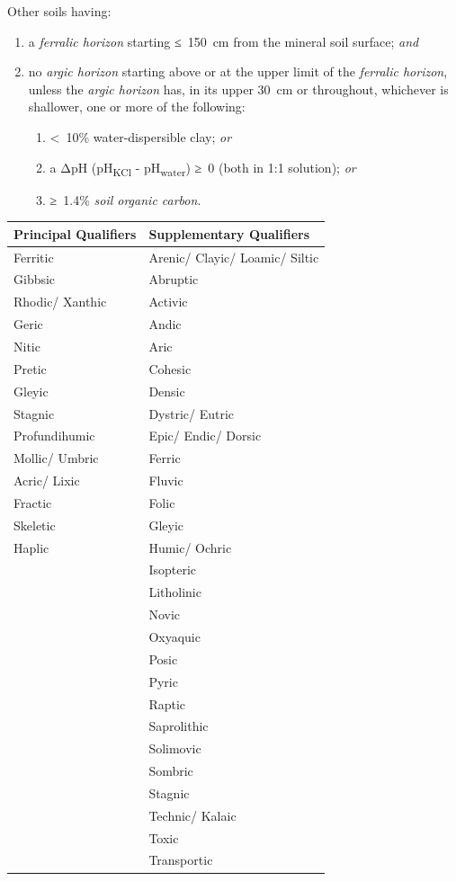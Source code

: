 \documentclass[
  letterpaper,
  DIV=11,
  numbers=noendperiod]{scrreprt}
\providecommand{\tightlist}{%
  \setlength{\itemsep}{0pt}\setlength{\parskip}{0pt}}\usepackage{longtable,booktabs,array}
\begin{document}
Other soils having:

\begin{enumerate}
\def\labelenumi{\arabic{enumi}.}
\tightlist
\item
  a \emph{ferralic horizon} starting ≤~150~cm from the mineral soil
  surface; \emph{and}
\item
  no \emph{argic horizon} starting above or at the upper limit of the
  \emph{ferralic horizon}, unless the \emph{argic horizon} has, in its
  upper 30~cm or throughout, whichever is shallower, one or more of the
  following:

  \begin{enumerate}
  \def\labelenumii{\alph{enumii}.}
  \tightlist
  \item
    \textless~10\% water-dispersible clay; \emph{or}
  \item
    a ΔpH (pH\textsubscript{KCl} - pH\textsubscript{water}) ≥~0 (both in
    1:1 solution); \emph{or}
  \item
    ≥~1.4\% \emph{soil organic carbon}.
  \end{enumerate}
\end{enumerate}

\begin{longtable}[]{@{}ll@{}}
\toprule()
Principal Qualifiers & Supplementary Qualifiers \\
\midrule()
\endhead
Ferritic & Arenic/ Clayic/ Loamic/ Siltic \\
Gibbsic & Abruptic \\
Rhodic/ Xanthic & Activic \\
Geric & Andic \\
Nitic & Aric \\
Pretic & Cohesic \\
Gleyic & Densic \\
Stagnic & Dystric/ Eutric \\
Profundihumic & Epic/ Endic/ Dorsic \\
Mollic/ Umbric & Ferric \\
Acric/ Lixic & Fluvic \\
Fractic & Folic \\
Skeletic & Gleyic \\
Haplic & Humic/ Ochric \\
& Isopteric \\
& Litholinic \\
& Novic \\
& Oxyaquic \\
& Posic \\
& Pyric \\
& Raptic \\
& Saprolithic \\
& Solimovic \\
& Sombric \\
& Stagnic \\
& Technic/ Kalaic \\
& Toxic \\
& Transportic \\
\bottomrule()
\end{longtable}
\end{document}
